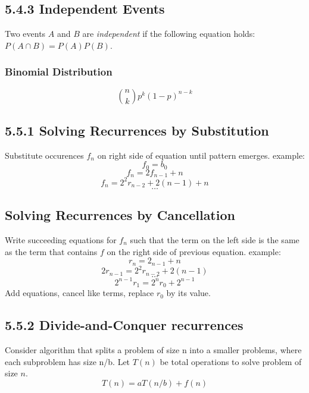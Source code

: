 \documentclass[10pt,twocolumn]{article}
\begin{document}
	\subsection*{5.4.3 Independent Events}
	
	Two events $A$ and $B$ are \emph{independent} if the following equation holds: $P(A \cap B)=P(A)P(B)$.
	
	\subsubsection*{Binomial Distribution}
	\[\binom{n}{k}p^k(1-p)^{n-k}\]

	\subsection*{5.5.1 Solving Recurrences by Substitution}
	Substitute occurences $f_n$ on right side of equation until pattern emerges. example:
		\[f_0=b_0\]
		\[f_n=2f_{n-1}+n\]
		\[f_n=2^2r_{n-2}+2(n-1)+n\]
		\[\ldots\]
	
	\subsection*{Solving Recurrences by Cancellation}
	Write succeeding equations for $f_n$ such that the term on the left side is the same as the term that contains $f$ on the right side of previous equation. example:
		\[r_n=2_{n-1}+n\]
		\[2r_{n-1}=2^2r_{n-2}+2(n-1)\]
		\[\ldots\]
		\[2^{n-1}r_1=2^nr_0+2^{n-1}\]
	Add equations, cancel like terms, replace $r_0$ by its value.
	
	\subsection*{5.5.2 Divide-and-Conquer recurrences}
	Consider algorithm that splits a problem of size n into a smaller problems, where each subproblem has size n/b.  Let $T(n)$ be total operations to solve problem of size $n$.
		\[T(n)=aT(n/b)+f(n)\]
	
\end{document}
